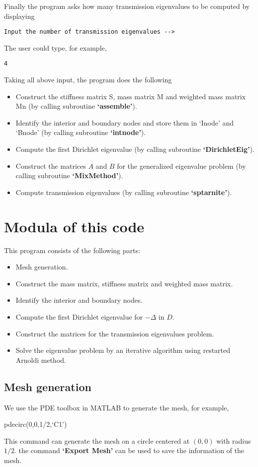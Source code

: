 \documentclass[12pt]{article}%
\numberwithin{equation}{section}
\numberwithin{remark}{section}
\numberwithin{example}{section}
\begin{document}
Finally the program asks how many transmission eigenvalues to be computed by displaying
\begin{verbatim}
Input the number of transmission eigenvalues -->
\end{verbatim}
The user could type, for example,
\begin{verbatim}
4
\end{verbatim}
Taking all above input, the program does the following
\begin{itemize}
\item[1.] Construct the stiffness matrix S, mass matrix M and weighted mass matrix Mn (by calling subroutine \textbf{`assemble'}).
\item[2.] Identify the interior and boundary nodes and store them in `Inode' and `Bnode' (by calling subroutine \textbf{`intnode'}).
\item[3.] Compute the first Dirichlet eigenvalue (by calling subroutine \textbf{`DirichletEig'}).
\item[4.] Construct the matrices $A$ and $B$ for the generalized eigenvalue problem (by calling subroutine \textbf{`MixMethod'}).
\item[5.] Compute transmission eigenvalues (by calling subroutine \textbf{`sptarnite'}).
\end{itemize}
\section{Modula of this code}
This program consists of the following parts:
\begin{itemize}
\item Mesh generation.
\item Construct the mass matrix, stiffness matrix and weighted mass matrix.
\item Identify the interior and boundary nodes.
\item Compute the first Dirichlet
eigenvalue for $-\Delta $ in $D$.
\item Construct the matrices for the transmission eigenvalues problem.
\item Solve the eigenvalue problem by an iterative algorithm using restarted Arnoldi method.
\end{itemize}
\subsection{Mesh generation}
We use the PDE toolbox in MATLAB to generate the mesh, for example,
 \begin{shaded}
 {pdecirc}(0,0,1/2,`{C}1')
 \end{shaded}
This command can generate the mesh on a circle centered at $(0,0)$ with radius $1/2$.
the command \textbf{`Export Mesh'} can be used to save the information of the mesh.
\end{document}
